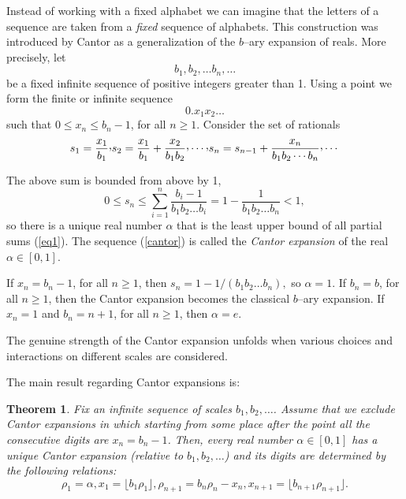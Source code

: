 \documentclass[11pt,a4paper,twoside]{article}
\newtheorem{theo}{Theorem}
\begin{document}
Instead of working with a fixed alphabet we can imagine that the letters of
a sequence are taken from a {\it fixed}
sequence of alphabets.  This construction was introduced by Cantor
as a generalization of the $b$--ary
expansion of reals.  More precisely, let
\[b_1, b_2, \ldots b_n, \ldots\]
be a fixed infinite sequence of positive integers greater than 1. Using a
point we form the finite or infinite sequence
\begin{equation}
\label{cantor}
0.x_{1}x_{2} \ldots
\end{equation}
such that  $0 \le x_n \le b_n-1$, for all $n\ge 1$. Consider the set of
rationals
\begin{equation}
\label{eq1}
s_1 = \frac{x_1}{b_1}  \raisebox{.5ex}{,}  s_2 = \frac{x_1}{b_1} +
\frac{x_2}{b_1b_2}
\raisebox{.5ex}{,}  \cdots \raisebox{.5ex}{,}  s_n =
s_{n-1} + \frac{x_n}{b_1 b_2 \cdots b_n}\raisebox{.5ex}{,} \cdots
\end{equation}

The above sum is bounded from above by 1,
\[0 \le s_n \le \sum_{i=1}^n \frac{b_i - 1}{b_1 b_2 \ldots b_i} = 1 -
\frac{1}{b_1 b_2 \ldots b_n} < 1,\]
so there is a unique real number $\alpha$ that is the least upper bound of
all partial sums (\ref{eq1}). The sequence (\ref{cantor}) is called the {\it
Cantor  expansion}
of the real $\alpha \in [0,1]$.


If $x_n = b_n -1$, for all $n \ge 1$, then $s_n = 1 -
1/(b_1 b_2 \ldots b_n),$ so $\alpha =1$.
If $b_n = b$, for all $n\ge 1$, then the Cantor expansion becomes the
classical $b$--ary expansion. If $x_n =1$ and $b_n = n+1$, for all $n \ge
1$, then $\alpha = e$.

The genuine strength of the Cantor expansion unfolds
when various choices and  interactions on different scales are
considered.

The main result regarding Cantor expansions is:


\begin{theo}
Fix an infinite sequence of scales $b_1, b_2, \ldots$.  Assume that we
exclude Cantor expansions in which starting from some place after the point
all the consecutive digits are $x_n = b_n -1$. Then, every real number
$\alpha\in [0,1]$ has  a unique Cantor expansion (relative to $b_1, b_2,
\ldots$)
and its digits are determined by the following relations:
\[ \rho_1 = \alpha, x_1 = \lfloor b_1 \rho_1\rfloor, \rho_{n+1} = b_n \rho_n
- x_n, x_{n+1} = \lfloor b_{n+1} \rho_{n+1}\rfloor.\]
\end{theo}
\end{document}
